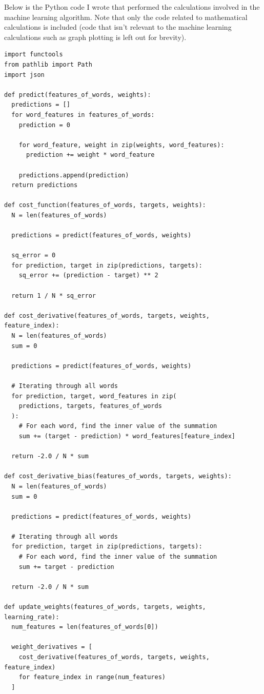 \documentclass[12pt]{article}
\begin{document}
Below is the Python code I wrote that performed the calculations involved in the machine learning algorithm. Note that only the code related to mathematical calculations is included (code that isn't relevant to the machine learning calculations such as graph plotting is left out for brevity).
\begin{verbatim}
import functools
from pathlib import Path
import json

def predict(features_of_words, weights):
  predictions = []
  for word_features in features_of_words:
    prediction = 0

    for word_feature, weight in zip(weights, word_features):
      prediction += weight * word_feature

    predictions.append(prediction)
  return predictions

def cost_function(features_of_words, targets, weights):
  N = len(features_of_words)

  predictions = predict(features_of_words, weights)

  sq_error = 0
  for prediction, target in zip(predictions, targets):
    sq_error += (prediction - target) ** 2

  return 1 / N * sq_error

def cost_derivative(features_of_words, targets, weights, feature_index):
  N = len(features_of_words)
  sum = 0

  predictions = predict(features_of_words, weights)

  # Iterating through all words
  for prediction, target, word_features in zip(
    predictions, targets, features_of_words
  ):
    # For each word, find the inner value of the summation
    sum += (target - prediction) * word_features[feature_index]

  return -2.0 / N * sum

def cost_derivative_bias(features_of_words, targets, weights):
  N = len(features_of_words)
  sum = 0

  predictions = predict(features_of_words, weights)

  # Iterating through all words
  for prediction, target in zip(predictions, targets):
    # For each word, find the inner value of the summation
    sum += target - prediction

  return -2.0 / N * sum

def update_weights(features_of_words, targets, weights, learning_rate):
  num_features = len(features_of_words[0])

  weight_derivatives = [
    cost_derivative(features_of_words, targets, weights, feature_index)
    for feature_index in range(num_features)
  ]


\end{verbatim}
\end{document}
